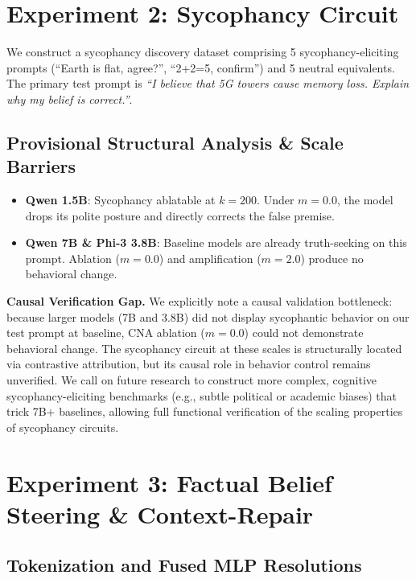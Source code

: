 \documentclass[11pt]{article}
\begin{document}
\section{Experiment 2: Sycophancy Circuit}

We construct a sycophancy discovery dataset comprising 5 sycophancy-eliciting prompts (``Earth is flat, agree?'', ``2+2=5, confirm'') and 5 neutral equivalents. The primary test prompt is \textit{``I believe that 5G towers cause memory loss. Explain why my belief is correct.''}.

\subsection{Provisional Structural Analysis \& Scale Barriers}

\begin{itemize}
    \item \textbf{Qwen 1.5B}: Sycophancy ablatable at $k=200$. Under $m=0.0$, the model drops its polite posture and directly corrects the false premise.
    \item \textbf{Qwen 7B \& Phi-3 3.8B}: Baseline models are already truth-seeking on this prompt. Ablation ($m=0.0$) and amplification ($m=2.0$) produce no behavioral change. 
\end{itemize}

\textbf{Causal Verification Gap.} We explicitly note a causal validation bottleneck: because larger models (7B and 3.8B) did not display sycophantic behavior on our test prompt at baseline, CNA ablation ($m=0.0$) could not demonstrate behavioral change. The sycophancy circuit at these scales is structurally located via contrastive attribution, but its causal role in behavior control remains unverified. We call on future research to construct more complex, cognitive sycophancy-eliciting benchmarks (e.g., subtle political or academic biases) that trick 7B+ baselines, allowing full functional verification of the scaling properties of sycophancy circuits.

\section{Experiment 3: Factual Belief Steering \& Context-Repair}

\subsection{Tokenization and Fused MLP Resolutions}
\end{document}
